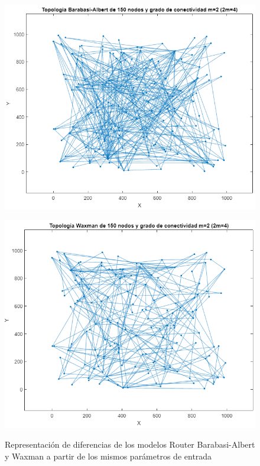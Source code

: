 \begin{figure}[h!]
    \centering
    \begin{minipage}{0.5\textwidth}
      \centering
      \includegraphics[width=\linewidth]{img/diseno/britebarabasi.png}
      \label{fig:grafbrite1}
    \end{minipage}\hfill
    \begin{minipage}{0.5\textwidth}
      \centering
      \includegraphics[width=\linewidth]{img/diseno/britewaxman.png}
      \label{fig:grafbrite2}
    \end{minipage}\hfill
    \caption{Representación de diferencias de los modelos Router Barabasi-Albert y Waxman a partir de los mismos parámetros de entrada}
    \label{fig:grafbrite}
\end{figure}